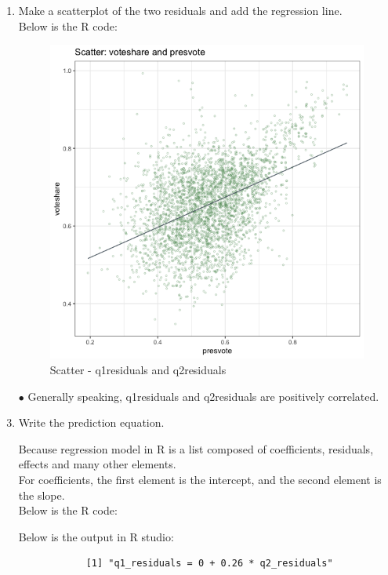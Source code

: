 \documentclass[12pt,letterpaper]{article}
\begin{document}
\begin{enumerate}
		\newpage
		
		\item Make a scatterplot of the two residuals and add the regression line. \\
		
		Below is the R code:
		
		\begin{figure}[h]
			\centering
			\caption{Scatter - q1residuals and q2residuals}
			\includegraphics[scale=0.5]{q3_scatter.png}
		\end{figure}
		\item[$\bullet$] Generally speaking, q1residuals and q2residuals are positively correlated.
		
		\newpage
			
		\item Write the prediction equation.
		
		Because regression model in R is a list composed of coefficients, residuals, effects and many other elements. \\
		
		For coefficients, the first element is the intercept, and the second element is the slope. \\
		
		Below is the R code:
		
		
		Below is the output in R studio:
		\begin{verbatim}
			[1] "q1_residuals = 0 + 0.26 * q2_residuals"
		\end{verbatim}
		
	\end{enumerate}
	
\end{document}
